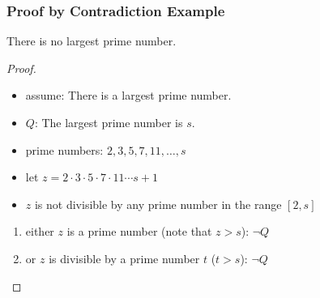 \documentclass[dvipsnames]{beamer}
\begin{document}
\begin{frame}
  \frametitle{Proof by Contradiction Example}

  \begin{theorem}
    There is no largest prime number.
  \end{theorem}

  \pause
  \begin{proof}
    \begin{itemize}
      \item assume: There is a largest prime number.

      \pause
      \item $Q$: The largest prime number is $s$.

      \pause
      \item prime numbers: $2,3,5,7,11,\dots,s$

      \pause
      \item let $z = 2 \cdot 3 \cdot 5 \cdot 7 \cdot 11 \cdots s + 1$\\
      \item $z$ is not divisible by any prime number in the range $[2, s]$
    \end{itemize}

    \pause
    \begin{enumerate}
      \item either $z$ is a prime number (note that $z > s$): $\neg Q$

      \pause
      \item or $z$ is divisible by a prime number $t$ ($t > s$): $\neg Q$
    \end{enumerate}
  \end{proof}
\end{frame}
\end{document}
